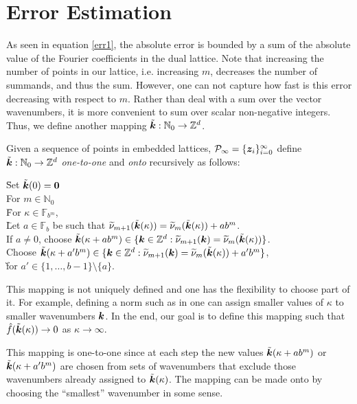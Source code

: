 \documentclass[graybox]{svmult}
\newcommand{\Z}{\mathbb{Z}} %
\newcommand{\N}{\mathbb{N}} %
\newcommand{\F}{\mathbb{F}} %
\newcommand{\bszero}{\boldsymbol{0}} %
\newcommand{\bsz}{\boldsymbol{z}}    %
\begin{document}
\section{Error Estimation}\label{secerrest}

As seen in equation \eqref{err1}, the absolute error is bounded by a sum of the absolute value of the Fourier coefficients in the dual lattice. Note that increasing the number of points in our lattice, i.e. increasing $m$, decreases the number of summands, and thus the sum. However, one can not capture how fast is this error decreasing with respect to $m$.  Rather than deal with a sum over the vector wavenumbers, it is more convenient to sum over scalar non-negative integers.  Thus, we define another mapping $\tvk: \N_0 \to \Z^d$.

\begin{definition} \label{wavenummapdef} Given a sequence of points in embedded lattices, $\cp_{\infty} = \{\bsz_i\}_{i=0}^{\infty}$ define $\tvk: \N_0 \to \Z^d$ \emph{one-to-one} and \emph{onto} recursively as follows:
\begin{tabbing}
\hspace{0.5cm} \= Set $\tvk(0)=\bszero$ \+ \\
For $m\in \N_0$ \\
\hspace{0.3cm} \= For $\kappa \in \F_{b^m}$,  \+ \\
\hspace{0.3cm} \= Let $a\in \F_b$ be such that $\widetilde{\nu}_{m+1}(\tilde{\boldsymbol{k}}(\kappa))= \widetilde{\nu}_{m}(\tilde{\boldsymbol{k}}(\kappa)) + ab^m$. \+ \\
If $a\ne 0$, choose $\tvk(\kappa+a b^m) \in \{\bsk \in  \Z^d : \tnu_{m+1}(\bsk)=\tnu_{m}(\tvk(\kappa))\}$. \\
Choose $\tvk(\kappa+a' b^m) \in \{\bsk \in  \Z^d : \tnu_{m+1}(\bsk)=\tnu_{m}(\tvk(\kappa))+a' b^m \}$, \\ \` for  $a'\in \{1, \ldots, b-1\}\setminus \{a\}$.
\end{tabbing}
\end{definition}

This mapping is not uniquely defined and one has the flexibility to choose part of it. For example, defining a norm such as in \cite[Chap. 4]{SloJoe94} one can assign smaller values of $\kappa$ to smaller wavenumbers $\boldsymbol{k}$. In the end, our goal is to define this mapping such that $\hat{f}(\tilde{\boldsymbol{k}}(\kappa))\rightarrow 0$ as $\kappa \to \infty$.

This mapping is one-to-one since at each step the new values $\tilde{\boldsymbol{k}}(\kappa+a b^m)$ or $\tilde{\boldsymbol{k}}(\kappa+a' b^m)$ are chosen from sets of wavenumbers that exclude those wavenumbers already assigned to $\tilde{\boldsymbol{k}}(\kappa)$.  The mapping can be made onto by choosing the ``smallest'' wavenumber in some sense. 
\end{document}
